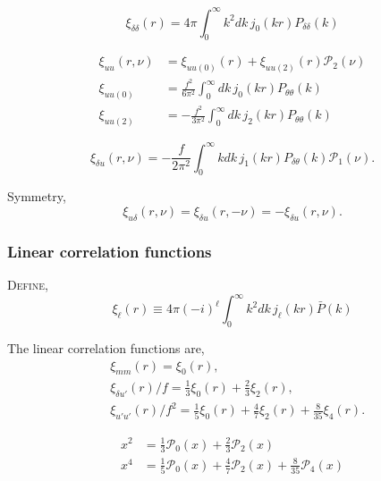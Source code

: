 \documentclass[a4paper,11pt, fleqn]{article}
\begin{document}
\begin{equation}
  \xi_{\delta\delta}(r) = 4\pi \int_0^\infty \! k^2 dk\,
  j_0(kr) P_{\delta\delta}(k)
\end{equation}

\begin{align}
  \xi_{uu}(r, \nu) &= \xi_{uu(0)}(r) + \xi_{uu(2)}(r) \mathcal{P}_2(\nu)\\
  \xi_{uu(0)} &= \frac{f^2}{6 \pi^2} \int_0^\infty \!dk\,
                   j_0(kr) P_{\theta\theta}(k)\\
  \xi_{uu(2)} &= -\frac{f^2}{3 \pi^2} \int_0^\infty \! dk\,
                   j_2(kr) P_{\theta\theta}(k)
\end{align}

\begin{equation}
  \xi_{\delta u}(r, \nu) = -\frac{f}{2\pi^2}
                            \int_0^\infty\! k dk \, j_1(kr) P_{\delta \theta}(k)
                            \mathcal{P}_1(\nu).
\end{equation}

Symmetry,
\begin{equation}
  \xi_{u \delta}(r, \nu) = \xi_{\delta u}(r, -\nu) = -\xi_{\delta u}(r, \nu).
\end{equation}

\clearpage
\subsubsection{Linear correlation functions}
\textsc{Define},
%
\begin{equation}
  \xi_{\ell}(r)
  \equiv 4\pi (-i)^\ell \int_0^\infty \! k^2 dk \, j_\ell(kr) \bar{P}(k)
\end{equation}


The linear correlation functions are,
\begin{align}
  &\xi_{mm}(r) = \xi_0(r),\\
  &\xi_{\delta u'}(r)/f = \frac{1}{3} \xi_0(r) + \frac{2}{3} \xi_2(r),\\
  &\xi_{u'u'}(r)/f^2 = \frac{1}{5} \xi_0(r) + \frac{4}{7} \xi_2(r)
                      +\frac{8}{35} \xi_4(r).
\end{align}

\begin{align}
  x^2 &= \frac{1}{3} \mathcal{P}_0(x) + \frac{2}{3} \mathcal{P}_2(x)\\
  x^4 &= \frac{1}{5}\mathcal{P}_0(x)
  + \frac{4}{7} \mathcal{P}_2(x)
  + \frac{8}{35} \mathcal{P}_4(x)
\end{align}
  
\end{document}
